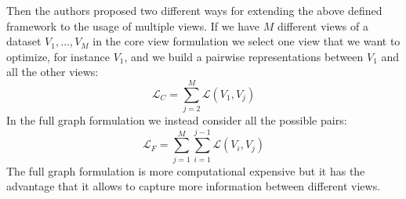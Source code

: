 Then the authors proposed two different ways for extending the above defined framework to the usage of multiple views. If we have $M$ different views of a dataset $V_1, \dots, V_M$ in the core view formulation we select one view that we want to optimize, for instance $V_1$, and we build a pairwise representations between $V_1$ and all the other views:
\[ \mathcal{L}_C = \sum_{j=2}^{M} \mathcal{L}(V_1, V_j)\]
In the full graph formulation we instead consider all the possible pairs:
\[ \mathcal{L}_F = \sum_{j=1}^{M} \sum_{i=1}^{j-1} \mathcal{L}(V_i, V_j)\]
The full graph formulation is more computational expensive but it has the advantage that it allows to capture more information between different views.